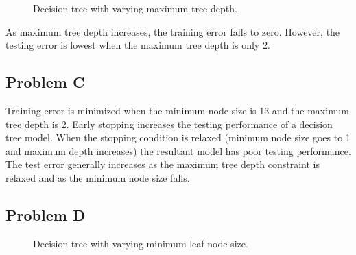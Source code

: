 \documentclass[12pt]{article} %
\begin{document}
\begin{figure}[H]
	\vspace{-10mm}
	\caption{Decision tree with varying maximum tree depth.}
\end{figure}

As maximum tree depth increases, the training error falls to zero. However, the testing error is lowest when the maximum tree depth is only 2.

\subsection{Problem C}
Training error is minimized when the minimum node size is 13 and the maximum tree depth is 2.  Early stopping increases the testing performance of a decision tree model. When the stopping condition is relaxed (minimum node size goes to 1 and maximum depth increases) the resultant model has poor testing performance. The test error generally increases as the maximum tree depth constraint is relaxed and as the minimum node size falls.

\subsection{Problem D}

\begin{figure}[H]
	\vspace{-10mm}
	\caption{Decision tree with varying minimum leaf node size.}
\end{figure}
\end{document}
